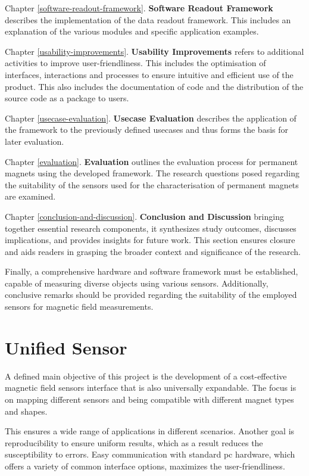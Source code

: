 Chapter \ref{software-readout-framework}. \textbf{Software Readout
Framework} describes the implementation of the data readout framework.
This includes an explanation of the various modules and specific
application examples.

Chapter \ref{usability-improvements}. \textbf{Usability Improvements}
refers to additional activities to improve user-friendliness. This
includes the optimisation of interfaces, interactions and processes to
ensure intuitive and efficient use of the product. This also includes
the documentation of code and the distribution of the source code as a
package to users.

Chapter \ref{usecase-evaluation}. \textbf{Usecase Evaluation} describes
the application of the framework to the previously defined usecases and
thus forms the basis for later evaluation.

Chapter \ref{evaluation}. \textbf{Evaluation} outlines the evaluation
process for permanent magnets using the developed framework. The
research questions posed regarding the suitability of the sensors used
for the characterisation of permanent magnets are examined.

Chapter \ref{conclusion-and-discussion}. \textbf{Conclusion and
Discussion} bringing together essential research components, it
synthesizes study outcomes, discusses implications, and provides
insights for future work. This section ensures closure and aids readers
in grasping the broader context and significance of the research.

Finally, a comprehensive hardware and software framework must be
established, capable of measuring diverse objects using various sensors.
Additionally, conclusive remarks should be provided regarding the
suitability of the employed sensors for magnetic field measurements.

\hypertarget{unified-sensor}{%
\chapter{Unified Sensor}\label{unified-sensor}}

A defined main objective of this project is the development of a
cost-effective magnetic field sensors interface that is also universally
expandable. The focus is on mapping different sensors and being
compatible with different magnet types and shapes.

This ensures a wide range of applications in different scenarios.
Another goal is reproducibility to ensure uniform results, which as a
result reduces the susceptibility to errors. Easy communication with
standard \gls{pc} hardware, which offers a variety of common interface
options, maximizes the user-friendliness.

